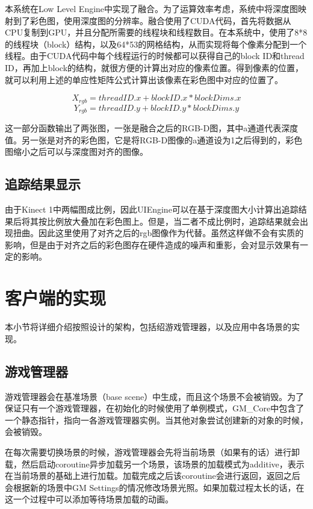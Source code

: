 本系统在Low Level Engine中实现了融合。为了运算效率考虑，系统中将深度图映射到了彩色图，使用深度图的分辨率。融合使用了CUDA代码，首先将数据从CPU复制到GPU，并且分配所需要的线程块和线程数目。在本系统中，使用了8*8的线程块（block）结构，以及64*53的网格结构，从而实现将每个像素分配到一个线程。由于CUDA代码中每个线程运行的时候都可以获得自己的block ID和thread ID，再加上block的结构，就很方便的计算出对应的像素位置。得到像素的位置，就可以利用上述的单应性矩阵公式计算出该像素在彩色图中对应的位置了。
	
\begin{equation}
 X_{rgb} = threadID.x + blockID.x * blockDims.x
\end{equation}
\begin{equation}
 Y_{rgb} = threadID.y + blockID.y * blockDims.y
\end{equation}

这一部分函数输出了两张图，一张是融合之后的RGB-D图，其中a通道代表深度值。另一张是对齐的彩色图，它是将RGB-D图像的a通道设为1之后得到的，彩色图缩小之后可以与深度图对齐的图像。

\subsection{追踪结果显示}

由于Kinect 1中两幅图成比例，因此UIEngine可以在基于深度图大小计算出追踪结果后将其按比例放大叠加在彩色图上。但是，当二者不成比例时，追踪结果就会出现扭曲。因此这里使用了对齐之后的rgb图像作为代替。虽然这样做不会有实质的影响，但是由于对齐之后的彩色图存在硬件造成的噪声和重影，会对显示效果有一定的影响。

\section{客户端的实现}
本小节将详细介绍按照设计的架构，包括绍游戏管理器，以及应用中各场景的实现。

\subsection{游戏管理器}
游戏管理器会在基准场景（base scene）中生成，而且这个场景不会被销毁。为了保证只有一个游戏管理器，在初始化的时候使用了单例模式，GM\_Core中包含了一个静态指针，指向一各游戏管理器实例。当其他对象尝试创建新的对象的时候，会被销毁。

在每次需要切换场景的时候，游戏管理器会先将当前场景（如果有的话）进行卸载，然后启动coroutine异步加载另一个场景，该场景的加载模式为additive，表示在当前场景的基础上进行加载。加载完成之后该coroutine会进行返回，返回之后会根据新的场景中GM Settings的情况修改场景光照。如果加载过程太长的话，在这一个过程中可以添加等待场景加载的动画。

